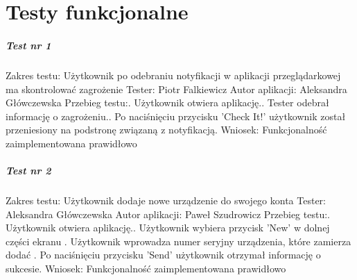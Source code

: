 \chapter{Testy funkcjonalne}

\paragraph{Test nr 1}
Zakres testu:\newline
Użytkownik po odebraniu notyfikacji w aplikacji przeglądarkowej ma skontrolować zagrożenie\newline
Tester: Piotr Falkiewicz\newline
Autor aplikacji: Aleksandra Główczewska\newline
Przebieg testu:. Użytkownik otwiera aplikację.. Tester odebrał informację o zagrożeniu.. Po naciśnięciu przycisku 'Check It!' użytkownik został przeniesiony na podstronę związaną z notyfikacją.\newline
Wniosek:\newline
Funkcjonalność zaimplementowana prawidłowo\newline
\newline

\paragraph{Test nr 2}
Zakres testu:\newline
Użytkownik dodaje nowe urządzenie do swojego konta\newline
Tester: Aleksandra Główczewska \newline
Autor aplikacji: Paweł Szudrowicz \newline
Przebieg testu:. Użytkownik otwiera aplikację.. Użytkownik wybiera przycisk 'New' w dolnej części ekranu . Użytkownik wprowadza numer seryjny urządzenia, które zamierza dodać . Po naciśnięciu przycisku 'Send' użytkownik otrzymał informację o sukcesie.\newline
Wniosek:\newline
Funkcjonalność zaimplementowana prawidłowo\newline
\newline
 

